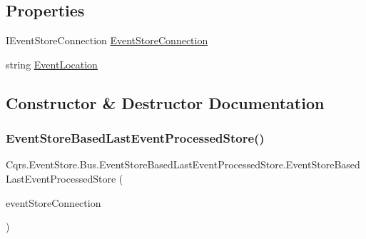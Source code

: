 \subsection*{Properties}
\begin{DoxyCompactItemize}
\item 
I\+Event\+Store\+Connection \hyperlink{classCqrs_1_1EventStore_1_1Bus_1_1EventStoreBasedLastEventProcessedStore_acce685c2420cae5df4291fea96e20e64_acce685c2420cae5df4291fea96e20e64}{Event\+Store\+Connection}
\item 
string \hyperlink{classCqrs_1_1EventStore_1_1Bus_1_1EventStoreBasedLastEventProcessedStore_a3f4ac10a5ede43130099f2d1b421ea1c_a3f4ac10a5ede43130099f2d1b421ea1c}{Event\+Location}
\end{DoxyCompactItemize}


\subsection{Constructor \& Destructor Documentation}
\mbox{\label{classCqrs_1_1EventStore_1_1Bus_1_1EventStoreBasedLastEventProcessedStore_a54dc3860c38026fd298bd204e3079490_a54dc3860c38026fd298bd204e3079490}} 
\subsubsection{\texorpdfstring{Event\+Store\+Based\+Last\+Event\+Processed\+Store()}{EventStoreBasedLastEventProcessedStore()}}
{\footnotesize\ttfamily Cqrs.\+Event\+Store.\+Bus.\+Event\+Store\+Based\+Last\+Event\+Processed\+Store.\+Event\+Store\+Based\+Last\+Event\+Processed\+Store (\begin{DoxyParamCaption}\item[{I\+Event\+Store\+Connection}]{event\+Store\+Connection }\end{DoxyParamCaption})}



